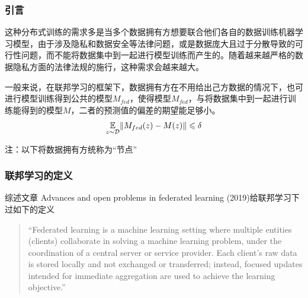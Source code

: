 
\begin{frame}
\frametitle{引言}

这种分布式训练的需求多是当多个数据拥有方想要联合他们各自的数据训练机器学习模型，由于涉及隐私和数据安全等法律问题，或是数据庞大且过于分散导致的可行性问题，而不能将数据集中到一起进行模型训练而产生的。随着越来越严格的数据隐私方面的法律法规的施行，这种需求会越来越大。

\pause
\vspace{0.8em}

一般来说，在联邦学习的框架下，数据拥有方在不用给出己方数据的情况下，也可进行模型训练得到公共的模型$M_{fed}$，使得模型$M_{fed}$，与将数据集中到一起进行训练能得到的模型$M$，二者的预测值的偏差的期望能足够小。
$$\operatorname*{\mathbb{E}}_{z\sim\mathcal{D}} \lVert M_{fed}(z) - M(z) \rVert \leqslant \delta$$

\vspace{0.5em}

{\footnotesize 注：以下将数据拥有方统称为``节点''}

\end{frame}


\begin{frame}
\frametitle{联邦学习的定义}

综述文章\cite{kairouz2019advances_fl} Advances and open problems in federated learning (2019)给联邦学习下过如下的定义

\vspace{0.8em}

\begin{quote}
    ``Federated learning is a machine learning setting where multiple entities (clients) collaborate in solving a machine learning problem, under the coordination of a central server or service provider. Each client's raw data is stored locally and not exchanged or transferred; instead, focused updates intended for immediate aggregation are used to achieve the learning objective.''
\end{quote}

\end{frame}


